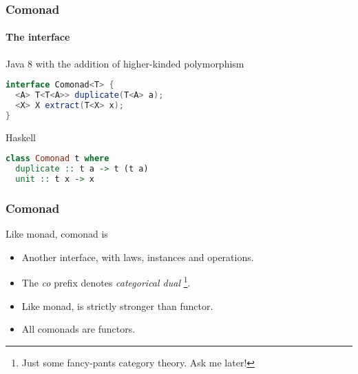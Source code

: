 \begin{frame}[fragile]
\frametitle{Comonad}
\framesubtitle{The interface}
\begin{block}{Java 8 with the addition of higher-kinded polymorphism}
\begin{lstlisting}[style=language,language=java]
interface Comonad<T> {
  <A> T<T<A>> duplicate(T<A> a);
  <X> X extract(T<X> x);
}
\end{lstlisting}
\end{block}
\begin{block}{Haskell}
\begin{lstlisting}[style=language,language=haskell]
class Comonad t where
  duplicate :: t a -> t (t a)
  unit :: t x -> x
\end{lstlisting}
\end{block}
\end{frame}

\begin{frame}[fragile]
\frametitle{Comonad}
\begin{block}{Like monad, comonad is}
\begin{itemize}
\item Another interface, with laws, instances and operations.
\item The \emph{co} prefix denotes \emph{categorical dual} \footnote{Just some fancy-pants category theory. Ask me later!}.
\item Like monad, is strictly stronger than functor.
\item All comonads are functors.
\end{itemize}
\end{block}
\end{frame}
